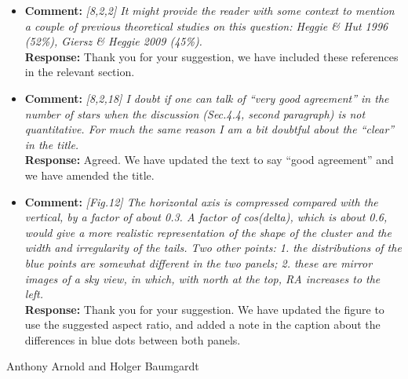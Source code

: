 \documentclass[aps,prl,reprint,showpacs,floatfix,superscriptaddress, onecolumn, 12pt]{revtex4-2}
\begin{document}
\begin{itemize}
    \item
    \textbf{Comment:} \textit{[8,2,2] It might provide the reader with some context to mention a
couple of previous theoretical studies on this question: Heggie & Hut
1996 (52\%), Giersz & Heggie 2009 (45\%).}\\
    \textbf{Response:} Thank you for your suggestion, we have included these references in the relevant section.

  \item
    \textbf{Comment:} \textit{[8,2,18] I doubt if one can talk of ``very good agreement'' in the number
of stars when the discussion (Sec.4.4, second paragraph) is not
quantitative. For much the same reason I am a bit doubtful about the
``clear'' in the title.}\\
    \textbf{Response:} Agreed. We have updated the text to say ``good agreement'' and we have amended the title.

  \item
    \textbf{Comment:} \textit{[Fig.12] The horizontal axis is compressed compared with the vertical,
by a factor of about 0.3. A factor of cos(delta), which is about 0.6,
would give a more realistic representation of the shape of the cluster
and the width and irregularity of the tails. Two other points: 1. the
distributions of the blue points are somewhat different in the two
panels; 2. these are mirror images of a sky view, in which, with north
at the top, RA increases to the left.}\\
    \textbf{Response:} Thank you for your suggestion. We have updated the figure to use the suggested aspect ratio, and added a note in the caption about the differences in blue dots between both panels.

\end{itemize}


Anthony Arnold and Holger Baumgardt
\end{document}
